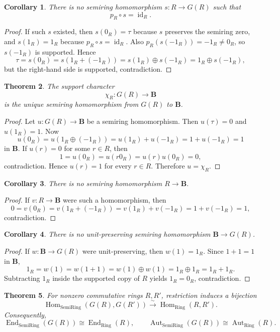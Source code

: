\documentclass[11pt]{amsart}
\numberwithin{equation}{section}
\newtheorem{theorem}{Theorem}[section]
\newtheorem{corollary}[theorem]{Corollary}
\theoremstyle{definition}
\newcommand{\B}{\mathbf B}
\newcommand{\Hom}{\operatorname{Hom}}
\newcommand{\End}{\operatorname{End}}
\newcommand{\Aut}{\operatorname{Aut}}
\newcommand{\id}{\operatorname{id}}
\begin{document}
\begin{corollary}\label{cor:no-splitting}
There is no semiring homomorphism $s:R\to G(R)$ such that
\[
p_R\circ s=\id_R.
\]
\end{corollary}

\begin{proof}
If such $s$ existed, then $s(0_R)=\tau$ because $s$ preserves the semiring zero, and $s(1_R)=1_R$ because $p_R\circ s=\id_R$. Also $p_R(s(-1_R))=-1_R\neq0_R$, so $s(-1_R)$ is supported. Hence
\[
\tau=s(0_R)=s(1_R+(-1_R))=s(1_R)\oplus s(-1_R)=1_R\oplus s(-1_R),
\]
but the right-hand side is supported, contradiction. 
\end{proof}

\begin{theorem}\label{thm:boolean-character-unique}
The support character
\[
\chi_R:G(R)\to\B
\]
is the unique semiring homomorphism from $G(R)$ to $\B$.
\end{theorem}

\begin{proof}
Let $u:G(R)\to\B$ be a semiring homomorphism. Then $u(\tau)=0$ and $u(1_R)=1$. Now
\[
u(0_R)=u(1_R\oplus (-1_R))=u(1_R)+u(-1_R)=1+u(-1_R)=1
\]
in $\B$. If $u(r)=0$ for some $r\in R$, then
\[
1=u(0_R)=u(r0_R)=u(r)u(0_R)=0,
\]
contradiction. Hence $u(r)=1$ for every $r\in R$. Therefore $u=\chi_R$. 
\end{proof}

\begin{corollary}\label{cor:no-ring-to-bool}
There is no semiring homomorphism $R\to\B$.
\end{corollary}

\begin{proof}
If $v:R\to\B$ were such a homomorphism, then
\[
0=v(0_R)=v(1_R+(-1_R))=v(1_R)+v(-1_R)=1+v(-1_R)=1,
\]
contradiction. 
\end{proof}

\begin{corollary}\label{cor:no-unital-bool-section}
There is no unit-preserving semiring homomorphism $\B\to G(R)$.
\end{corollary}

\begin{proof}
If $w:\B\to G(R)$ were unit-preserving, then $w(1)=1_R$. Since $1+1=1$ in $\B$,
\[
1_R=w(1)=w(1+1)=w(1)\oplus w(1)=1_R\oplus 1_R=1_R+1_R.
\]
Subtracting $1_R$ inside the supported copy of $R$ yields $1_R=0_R$, contradiction. 
\end{proof}

\begin{theorem}\label{thm:full-faithfulness}
For nonzero commutative rings $R,R'$, restriction induces a bijection
\[
\Hom_{\mathrm{SemiRing}}(G(R),G(R'))
\xrightarrow{\sim}
\Hom_{\mathrm{Ring}}(R,R').
\]
Consequently,
\[
\End_{\mathrm{SemiRing}}(G(R))\cong \End_{\mathrm{Ring}}(R),
\qquad
\Aut_{\mathrm{SemiRing}}(G(R))\cong \Aut_{\mathrm{Ring}}(R).
\]
\end{theorem}
\end{document}
